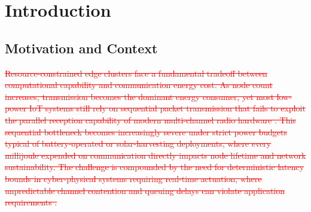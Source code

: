 \documentclass[pdflatex,sn-mathphys-num]{sn-jnl}
\theoremstyle{thmstyleone}
\theoremstyle{thmstyletwo}
\theoremstyle{thmstylethree}
\begin{document}
\section{Introduction}
\label{sec:introduction}

\subsection{Motivation and Context}
\label{subsec:computing_problem}

\textcolor{red}{\sout{Resource-constrained edge clusters face a fundamental tradeoff between computational capability and communication energy cost. As node count increases, transmission becomes the dominant energy consumer, yet most low-power IoT systems still rely on sequential packet transmission that fails to exploit the parallel reception capability of modern multi-channel radio hardware . This sequential bottleneck becomes increasingly severe under strict power budgets typical of battery-operated or solar-harvesting deployments, where every millijoule expended on communication directly impacts node lifetime and network sustainability. The challenge is compounded by the need for deterministic latency bounds in cyber-physical systems requiring real-time actuation, where unpredictable channel contention and queuing delays can violate application requirements .}}
\end{document}

